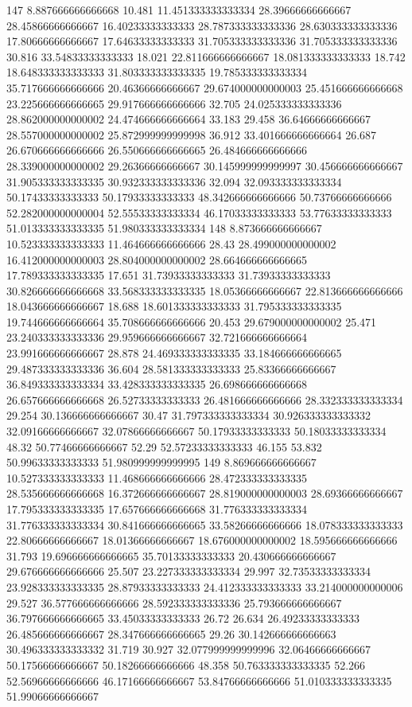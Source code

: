 147 8.887666666666668 10.481 11.451333333333334 28.39666666666667 28.45866666666667 16.40233333333333 28.787333333333336 28.630333333333336 17.80666666666667 17.64633333333333 31.705333333333336 31.705333333333336 30.816 33.54833333333333 18.021 22.811666666666667 18.081333333333333 18.742 18.648333333333333 31.803333333333335 19.785333333333334 35.717666666666666 20.46366666666667 29.674000000000003 25.451666666666668 23.225666666666665 29.917666666666666 32.705 24.025333333333336 28.862000000000002 24.474666666666664 33.183 29.458 36.64666666666667 28.557000000000002 25.872999999999998 36.912 33.401666666666664 26.687 26.670666666666666 26.550666666666665 26.484666666666666 28.339000000000002 29.26366666666667 30.145999999999997 30.456666666666667 31.905333333333335 30.932333333333336 32.094 32.093333333333334 50.17433333333333 50.17933333333333 48.342666666666666 50.73766666666666 52.282000000000004 52.55533333333334 46.17033333333333 53.77633333333333 51.013333333333335 51.980333333333334
148 8.873666666666667 10.523333333333333 11.464666666666666 28.43 28.499000000000002 16.412000000000003 28.804000000000002 28.664666666666665 17.789333333333335 17.651 31.73933333333333 31.73933333333333 30.826666666666668 33.568333333333335 18.05366666666667 22.813666666666666 18.043666666666667 18.688 18.601333333333333 31.795333333333335 19.744666666666664 35.708666666666666 20.453 29.679000000000002 25.471 23.240333333333336 29.959666666666667 32.721666666666664 23.991666666666667 28.878 24.469333333333335 33.184666666666665 29.487333333333336 36.604 28.581333333333333 25.83366666666667 36.849333333333334 33.428333333333335 26.698666666666668 26.657666666666668 26.52733333333333 26.481666666666666 28.332333333333334 29.254 30.136666666666667 30.47 31.797333333333334 30.926333333333332 32.09166666666667 32.07866666666667 50.17933333333333 50.18033333333334 48.32 50.77466666666667 52.29 52.57233333333333 46.155 53.832 50.99633333333333 51.980999999999995
149 8.869666666666667 10.527333333333333 11.468666666666666 28.472333333333335 28.535666666666668 16.372666666666667 28.819000000000003 28.69366666666667 17.795333333333335 17.657666666666668 31.776333333333334 31.776333333333334 30.841666666666665 33.58266666666666 18.078333333333333 22.80666666666667 18.01366666666667 18.676000000000002 18.595666666666666 31.793 19.696666666666665 35.70133333333333 20.430666666666667 29.676666666666666 25.507 23.227333333333334 29.997 32.73533333333334 23.928333333333335 28.87933333333333 24.412333333333333 33.214000000000006 29.527 36.577666666666666 28.592333333333336 25.793666666666667 36.797666666666665 33.45033333333333 26.72 26.634 26.49233333333333 26.485666666666667 28.347666666666665 29.26 30.142666666666663 30.496333333333332 31.719 30.927 32.077999999999996 32.06466666666667 50.17566666666667 50.18266666666666 48.358 50.763333333333335 52.266 52.56966666666666 46.17166666666667 53.84766666666666 51.010333333333335 51.99066666666667
